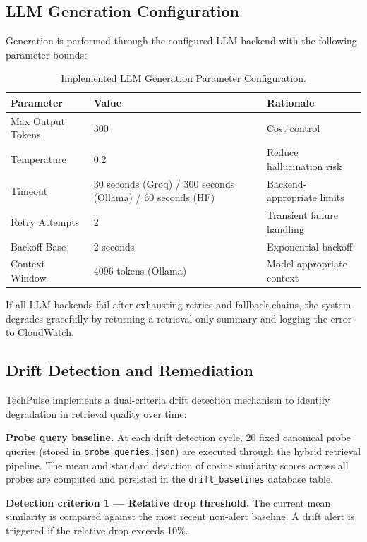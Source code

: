 \documentclass[12pt,a4paper]{report}
\begin{document}
\subsection{LLM Generation Configuration}

Generation is performed through the configured LLM backend with the following parameter bounds:

\begin{table}[H]
\caption{Implemented LLM Generation Parameter Configuration.}
\label{tab:llm_params}
\centering
\begin{tabular}{lll}
\toprule
\textbf{Parameter} & \textbf{Value} & \textbf{Rationale} \\
\midrule
Max Output Tokens & 300 & Cost control \\
Temperature & 0.2 & Reduce hallucination risk \\
Timeout & 30 seconds (Groq) / 300 seconds (Ollama) / 60 seconds (HF) & Backend-appropriate limits \\
Retry Attempts & 2 & Transient failure handling \\
Backoff Base & 2 seconds & Exponential backoff \\
Context Window & 4096 tokens (Ollama) & Model-appropriate context \\
\bottomrule
\end{tabular}
\end{table}

If all LLM backends fail after exhausting retries and fallback chains, the system degrades gracefully by returning a retrieval-only summary and logging the error to CloudWatch.

\subsection{Drift Detection and Remediation}
\label{sec:drift}

TechPulse implements a dual-criteria drift detection mechanism to identify degradation in retrieval quality over time:

\textbf{Probe query baseline.} At each drift detection cycle, 20 fixed canonical probe queries (stored in \texttt{probe\_queries.json}) are executed through the hybrid retrieval pipeline. The mean and standard deviation of cosine similarity scores across all probes are computed and persisted in the \texttt{drift\_baselines} database table.

\textbf{Detection criterion 1 --- Relative drop threshold.} The current mean similarity is compared against the most recent non-alert baseline. A drift alert is triggered if the relative drop exceeds 10\%.
\end{document}
